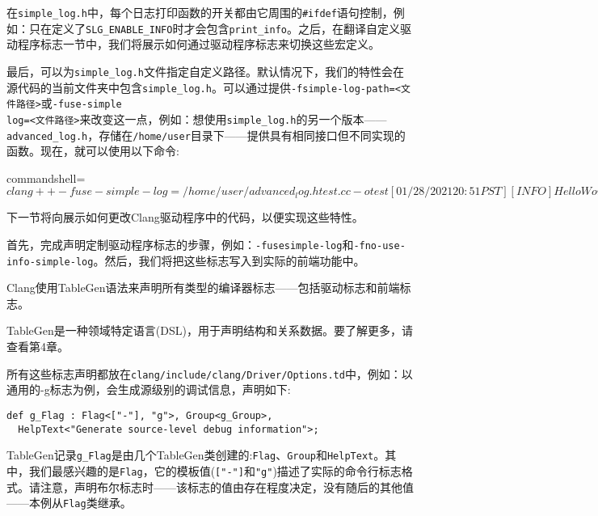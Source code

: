 在\texttt{simple\_log.h}中，每个日志打印函数的开关都由它周围的\texttt{\#ifdef}语句控制，例如：只在定义了\texttt{SLG\_ENABLE\_INFO}时才会包含\texttt{print\_info}。之后，在翻译自定义驱动程序标志一节中，我们将展示如何通过驱动程序标志来切换这些宏定义。

最后，可以为\texttt{simple\_log.h}文件指定自定义路径。默认情况下，我们的特性会在源代码的当前文件夹中包含\texttt{simple\_log.h}。可以通过提供\texttt{-fsimple-log-path=<文件路径>}或\texttt{-fuse-simple\\log=<文件路径>}来改变这一点，例如：想使用\texttt{simple\_log.h}的另一个版本——\texttt{advanced\_log.h}，存储在\texttt{/home/user}目录下——提供具有相同接口但不同实现的函数。现在，就可以使用以下命令:

\begin{tcblisting}{commandshell={}}
$ clang++ -fuse-simple-log=/home/user/advanced_log.h test.cc -o
test
[01/28/2021 20:51 PST][INFO] Hello World!!
$
\end{tcblisting}

下一节将向展示如何更改Clang驱动程序中的代码，以便实现这些特性。


首先，完成声明定制驱动程序标志的步骤，例如：\texttt{-fusesimple-log}和\texttt{-fno-use-info-simple-log}。然后，我们将把这些标志写入到实际的前端功能中。

Clang使用TableGen语法来声明所有类型的编译器标志——包括驱动标志和前端标志。

\begin{tcolorbox}[colback=blue!5!white,colframe=blue!75!black, fonttitle=\bfseries,title=TableGen]	
\hspace*{0.7cm}TableGen是一种领域特定语言(DSL)，用于声明结构和关系数据。要了解更多，请查看第4章。
\end{tcolorbox}

所有这些标志声明都放在\texttt{clang/include/clang/Driver/Options.td}中，例如：以通用的-g标志为例，会生成源级别的调试信息，声明如下:

\begin{lstlisting}[style=stylePython]
def g_Flag : Flag<["-"], "g">, Group<g_Group>,
  HelpText<"Generate source-level debug information">;
\end{lstlisting}

TableGen记录\texttt{g\_Flag}是由几个TableGen类创建的:\texttt{Flag}、\texttt{Group}和\texttt{HelpText}。其中，我们最感兴趣的是\texttt{Flag}，它的模板值(\texttt{["-"]}和\texttt{"g"})描述了实际的命令行标志格式。请注意，声明布尔标志时——该标志的值由存在程度决定，没有随后的其他值——本例从\texttt{Flag}类继承。

